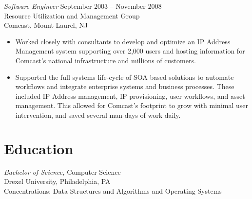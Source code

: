 \documentclass[margin]{res}
\begin{document}
\begin{resume}
  {\sl Software Engineer} \hfill	September 2003 -- November 2008 \\
    Resource Utilization and Management Group \\
    Comcast, Mount Laurel, NJ
    \begin{itemize}  \itemsep -2pt %
      \item Worked closely with consultants to develop and optimize an IP Address Management system supporting over 2,000 users and hosting information for Comcast's national infrastructure and millions of customers.
      \item Supported the full systems life-cycle of SOA based solutions to automate workflows and integrate enterprise systems and business processes.
            These included IP Address management, IP provisioning, user workflows, and asset management.
            This allowed for Comcast's footprint to grow with minimal user intervention, and saved several man-days of work daily.
     \end{itemize} 


\section{Education} {\sl Bachelor of Science,} Computer Science \\
   Drexel University, Philadelphia, PA \\
   Concentrations: Data Structures and Algorithms and Operating Systems



\end{resume}
\end{document}
